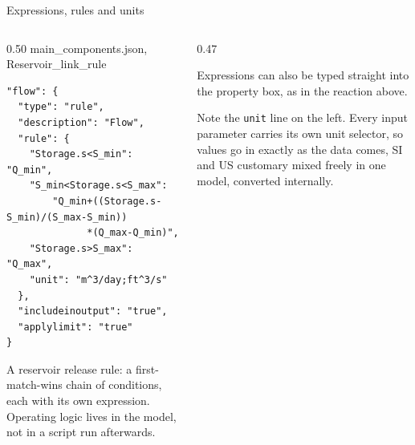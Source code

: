 \documentclass[aspectratio=169, 10pt]{beamer}
\begin{document}
\begin{frame}[fragile]{Expressions, rules and units}
  \begin{columns}[T,onlytextwidth]
    \begin{column}{0.50\textwidth}
      {\tiny\color{ohqgrey}\ttfamily main\_components.json, Reservoir\_link\_rule}
      \vspace{-1pt}
\begin{lstlisting}[style=ohqjsonstyle]
"flow": {
  "type": "rule",
  "description": "Flow",
  "rule": {
    "Storage.s<S_min": "Q_min",
    "S_min<Storage.s<S_max":
        "Q_min+((Storage.s-S_min)/(S_max-S_min))
              *(Q_max-Q_min)",
    "Storage.s>S_max": "Q_max",
    "unit": "m^3/day;ft^3/s"
  },
  "includeinoutput": "true",
  "applylimit": "true"
}
\end{lstlisting}
      {\scriptsize A reservoir release rule: a first-match-wins chain of
      conditions, each with its own expression. Operating logic lives in the
      model, not in a script run afterwards.}
      \vspace{-2pt}
    \end{column}
    \begin{column}{0.47\textwidth}
      \begin{center}
      \end{center}
      \vspace{-2pt}
      {\scriptsize Expressions can also be typed straight into the property
      box, as in the reaction above.

      \vspace{2pt}
      Note the \texttt{unit} line on the left. \alert{Every input parameter
      carries its own unit selector}, so values go in exactly as the data
      comes, SI and US customary mixed freely in one model, converted
      internally.}
    \end{column}
  \end{columns}
\end{frame}
\end{document}
